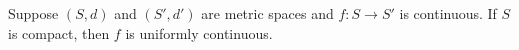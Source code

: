 Suppose $(S, d)$ and $(S', d')$ are metric spaces and $f: S \to S'$ is continuous. If $S$ is compact, then $f$ is uniformly continuous.
